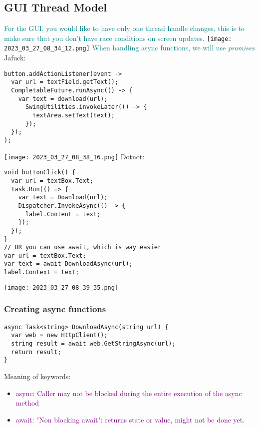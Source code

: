 \documentclass[main.tex,fontsize=8pt,paper=a4,paper=portrait,DIV=calc,]{scrartcl}
\begin{document}
\subsection{GUI Thread Model}
\textcolor{teal}{For the GUI, you would like to have only one thread handle changes, this is to make sure that you don't have race conditions on screen updates.}\newline
\texttt{[image: 2023\_03\_27\_08\_34\_12.png]}\newline
\textcolor{teal}{When handling async functions, we will use \emph{promises}}\newline
\lstset{
    language=Java,
    style=code,
}
Jafuck:
\begin{lstlisting}
button.addActionListener(event ->
  var url = textField.getText();
  CompletableFuture.runAsync(() -> {
    var text = download(url);
      SwingUtilities.invokeLater(() -> {
        textArea.setText(text);
      });
  });
);
\end{lstlisting}
\texttt{[image: 2023\_03\_27\_08\_38\_16.png]}\newline
\lstset{
  language=[sharp]C,
    style=code,
}
Dotnot:
\begin{lstlisting}
void buttonClick() {
  var url = textBox.Text;
  Task.Run(() => {
    var text = Download(url);
    Dispatcher.InvokeAsync(() -> {
      label.Content = text;
    });
  });
}
// OR you can use await, which is way easier
var url = textBox.Text;
var text = await DownloadAsync(url);
label.Context = text;
\end{lstlisting}
\texttt{[image: 2023\_03\_27\_08\_39\_35.png]}

\subsubsection{Creating async functions}
\begin{lstlisting}
async Task<string> DownloadAsync(string url) {
  var web = new HttpClient();
  string result = await web.GetStringAsync(url);
  return result;
}
\end{lstlisting}
Meaning of keywords:
\begin{itemize}
\item \textcolor{purple}{async: Caller may not be blocked during the entire execution of the async method}
\item \textcolor{purple}{await: "Non blocking await": returns state or value, might not be done yet.}
\end{itemize} 
\end{document}
